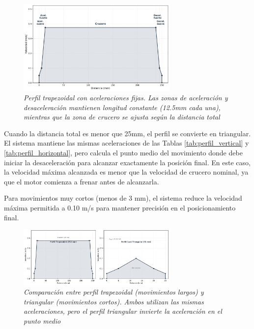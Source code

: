 \begin{figure}[H]
    \centering
    \includegraphics[width=0.7\textwidth]{imagenes/perfil_trapezoidal_velocidad.png}
    \caption{\textit{Perfil trapezoidal con aceleraciones fijas. Las zonas de aceleración y desaceleración mantienen longitud constante (12.5mm cada una), mientras que la zona de crucero se ajusta según la distancia total}}
    \label{fig:perfil_trapezoidal}
\end{figure}

Cuando la distancia total es menor que 25mm, el perfil se convierte en triangular. El sistema mantiene las mismas aceleraciones de las Tablas \ref{tab:perfil_vertical} y \ref{tab:perfil_horizontal}, pero calcula el punto medio del movimiento donde debe iniciar la desaceleración para alcanzar exactamente la posición final. En este caso, la velocidad máxima alcanzada es menor que la velocidad de crucero nominal, ya que el motor comienza a frenar antes de alcanzarla. 

Para movimientos muy cortos (menos de 3 mm), el sistema reduce la velocidad máxima permitida a 0.10 m/s para mantener precisión en el posicionamiento final.

\begin{figure}[H]
    \centering
    \includegraphics[width=0.7\textwidth]{imagenes/perfil_trapezoidal_triangular.png}
    \caption{\textit{Comparación entre perfil trapezoidal (movimientos largos) y triangular (movimientos cortos). Ambos utilizan las mismas aceleraciones, pero el perfil triangular invierte la aceleración en el punto medio}}
    \label{fig:perfil_comparacion}
\end{figure}


